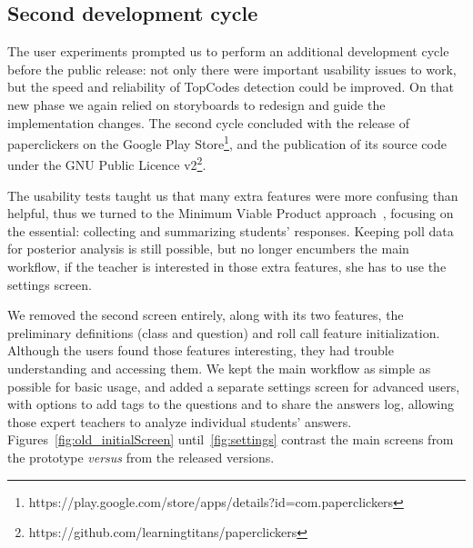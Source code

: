 \subsection{Second development cycle}
\label{sec:second_dev_cyvle}

The user experiments prompted us to perform an additional development cycle before the public release: not only there were important usability issues to work, but the speed and reliability of TopCodes detection could be improved. On that new phase we again relied on storyboards to redesign and guide the implementation changes. The second cycle concluded with the release of paperclickers on the Google Play Store\footnote{https://play.google.com/store/apps/details?id=com.paperclickers}, and the publication of its source code under the GNU Public Licence v2\footnote{https://github.com/learningtitans/paperclickers}.

The usability tests taught us that many extra features were more confusing than helpful, thus we turned to the Minimum Viable Product approach~\cite{ries2011lean}, focusing on the essential: collecting and summarizing students' responses. Keeping poll data for posterior analysis is still possible, but no longer encumbers the main workflow, if the teacher is interested in those extra features, she has to use the settings screen.


We removed the second screen entirely, along with its two features, the preliminary definitions (class and question) and roll call feature initialization. Although the users found those features interesting, they had trouble understanding and accessing them. %
We kept the main workflow as simple as possible for basic usage, and added a separate settings screen for advanced users, with options to add tags to the questions and to share the answers log, allowing those expert teachers to analyze individual students' answers. Figures~\ref{fig:old_initialScreen} until~\ref{fig:settings} contrast the main screens from the prototype \textit{versus} from the released versions.

